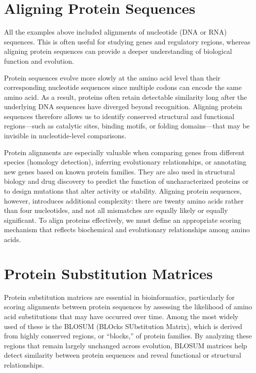 \section{Aligning Protein Sequences}

All the examples above included alignments of nucleotide (DNA or RNA) sequences. This is often useful for studying genes and regulatory regions, whereas aligning protein sequences can provide a deeper understanding of biological function and evolution. 

Protein sequences evolve more slowly at the amino acid level than their corresponding nucleotide sequences since multiple codons can encode the same amino acid. As a result, proteins often retain detectable similarity long after the underlying DNA sequences have diverged beyond recognition. Aligning protein sequences therefore allows us to identify conserved structural and functional regions—such as catalytic sites, binding motifs, or folding domains—that may be invisible in nucleotide-level comparisons.

Protein alignments are especially valuable when comparing genes from different species (homology detection), inferring evolutionary relationships, or annotating new genes based on known protein families. They are also used in structural biology and drug discovery to predict the function of uncharacterized proteins or to design mutations that alter activity or stability. Aligning protein sequences, however, introduces additional complexity: there are twenty amino acids rather than four nucleotides, and not all mismatches are equally likely or equally significant. To align proteins effectively, we must define an appropriate scoring mechanism that reflects biochemical and evolutionary relationships among amino acids.

\section{Protein Substitution Matrices}

Protein substitution matrices are essential in bioinformatics, particularly for scoring alignments between protein sequences by assessing the likelihood of amino acid substitutions that may have occurred over time. Among the most widely used of these is the BLOSUM (BLOcks SUbstitution Matrix),
which is derived from highly conserved regions, or “blocks,” of protein families. By analyzing these regions that remain largely unchanged across evolution, BLOSUM matrices help detect similarity between protein sequences and reveal functional or structural relationships.

